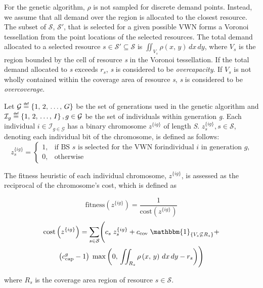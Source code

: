 \documentclass[12pt,dvips]{report}
\newcommand\myeq{\mathrel{\overset{\makebox[0pt]{\mbox{\normalfont\tiny\sffamily def}}}{=}}}
\begin{document}
For the genetic algorithm, $\rho$ is not sampled for discrete demand points.  Instead, we assume that all demand over the region is allocated to the closest resource.  The subset of $\mathcal{S}$, $\mathcal{S}'$, that is selected for a given possible VWN forms a Voronoi tessellation from the point locations of the selected resources.  The total demand allocated to a selected resource $s \in \mathcal{S}' \subseteq \mathcal{S}$ is $\iint_{V_s} \rho\left(x,\, y\right) \,dx \,dy$, where $V_s$ is the region bounded by the cell of resource \textit{s} in the Voronoi tessellation.  If the total demand allocated to \textit{s} exceeds $r_s$, \textit{s} is considered to be \textit{overcapacity}.  If $V_s$ is not wholly contained within the coverage area of resource \textit{s}, \textit{s} is considered to be \textit{overcoverage}.

Let $\mathcal{G} \myeq \left\{1,\, 2,\, \ldots,\, G\right\}$ be the set of generations used in the genetic algorithm and $\mathcal{I}_g \myeq \left\{1,\, 2,\, \ldots,\, I\right\}, g \in \mathcal{G}$ be the set of individuals within generation \textit{g}.  Each individual $i \in \mathcal{I}_{g \in \mathcal{G}}$ has a binary chromosome $z^{\{ig\}}$ of length \textit{S}.  $z_s^{\{ig\}}, s \in \mathcal{S}$, denoting each individual bit of the chromosome, is defined as follows:
\[ z_s^{\{ig\}} =
	\begin{cases}
		1,& \text{if BS $s$ is selected for the VWN for} \text{individual $i$ in generation $g$,}\\
		0,& \text{otherwise}
	\end{cases}
\]

The fitness heuristic of each individual chromosome, $z^{\{ig\}}$, is assessed as the reciprocal of the chromosome's cost, which is defined as

\begin{equation} \label{eq:GAFit}
\text{fitness}\left(z^{\{ig\}}\right) = \frac{1}{\text{cost}\left(z^{\{ig\}}\right)}
\end{equation}
\begin{multline} \label{eq:GACost}
\text{cost}\left(z^{\{ig\}}\right) = \sum_{s \in \mathcal{S}} \Biggl( c_s \; z_s^{\{ig\}} + c_\text{cov} \; \mathbbm{1}_{\left\{ V_s \not\subseteq R_s \right\}} + \\ \left(c_\text{cap}^g - 1\right) \; \max\left( 0,\, \iint_{R_s} \rho\left(x,\, y\right)\, dx\, dy - r_s \right) \Biggr)
\end{multline}

\noindent where $R_s$ is the coverage area region of resource $s \in \mathcal{S}$.
\end{document}
